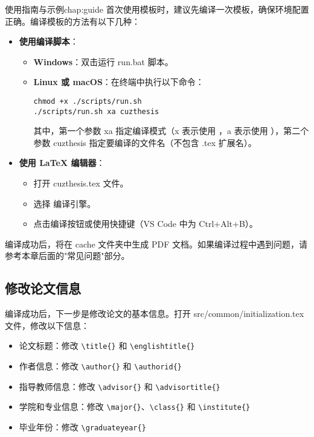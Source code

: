 \begin{cuzchapter}{使用指南与示例}{chap:guide}
    首次使用模板时，建议先编译一次模板，确保环境配置正确。编译模板的方法有以下几种：

    \begin{itemize}
        \item \textbf{使用编译脚本}：
        \begin{itemize}
            \item \textbf{Windows}：双击运行 run.bat 脚本。
            \item \textbf{Linux 或 macOS}：在终端中执行以下命令：
            \begin{verbatim}
chmod +x ./scripts/run.sh
./scripts/run.sh xa cuzthesis
            \end{verbatim}
            其中，第一个参数 xa 指定编译模式（x 表示使用 ，a 表示使用 ），第二个参数 cuzthesis 指定要编译的文件名（不包含 .tex 扩展名）。
        \end{itemize}

        \item \textbf{使用 \LaTeX{} 编辑器}：
        \begin{itemize}
            \item 打开 cuzthesis.tex 文件。
            \item 选择  编译引擎。
            \item 点击编译按钮或使用快捷键（VS Code 中为 Ctrl+Alt+B）。
        \end{itemize}
    \end{itemize}

    编译成功后，将在 cache 文件夹中生成 PDF 文档。如果编译过程中遇到问题，请参考本章后面的"常见问题"部分。

    \subsection{修改论文信息}

    编译成功后，下一步是修改论文的基本信息。打开 src/common/initialization.tex 文件，修改以下信息：

    \begin{itemize}
        \item 论文标题：修改 \verb|\title{}| 和 \verb|\englishtitle{}|
        \item 作者信息：修改 \verb|\author{}| 和 \verb|\authorid{}|
        \item 指导教师信息：修改 \verb|\advisor{}| 和 \verb|\advisortitle{}|
        \item 学院和专业信息：修改 \verb|\major{}|、\verb|\class{}| 和 \verb|\institute{}|
        \item 毕业年份：修改 \verb|\graduateyear{}|
    \end{itemize}


\end{cuzchapter}

